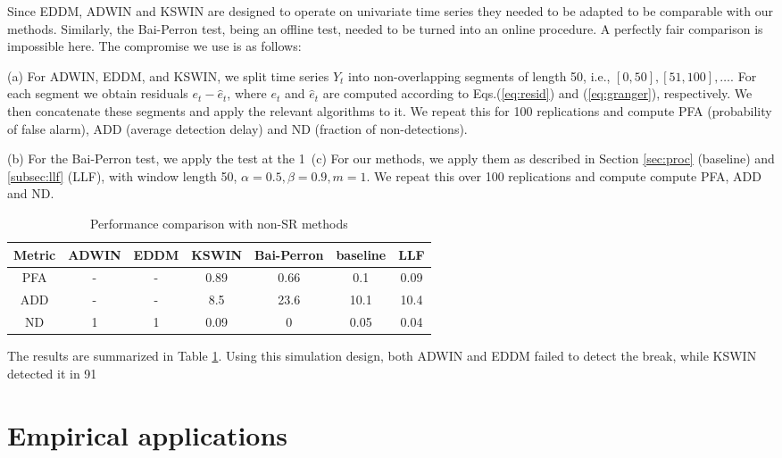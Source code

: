 Since EDDM, ADWIN and KSWIN are designed to operate on univariate time series they needed to be adapted to be comparable with our methods. Similarly, the Bai-Perron test, being an offline test, needed to be turned into an online procedure. A perfectly fair comparison is impossible here. The compromise we use is as follows:

(a) For ADWIN, EDDM, and KSWIN, we split time series $Y_t$ into non-overlapping segments of length 50, i.e., $[0,50], [51,100], \ldots.$ For each segment we obtain residuals $e_t - \hat{e}_t$, where $e_t$ and $\hat{e}_t$ are computed according to Eqs.(\ref{eq:resid}) and (\ref{eq:granger}), respectively. We then concatenate these segments and apply the relevant algorithms to it. We repeat this for 100 replications and compute PFA (probability of false alarm), ADD (average detection delay) and ND (fraction of non-detections).

(b) For the Bai-Perron test, we apply the test at the 1\
(c) For our methods, we apply them as described in Section \ref{sec:proc} (baseline) and  \ref{subsec:llf} (LLF), with window length 50, $\alpha = 0.5, \beta=0.9, m = 1$. We repeat this over 100 replications and compute compute PFA, ADD and ND.








\begin{table}[H]
    \centering
     \begin{tabular}{c | c c c c c c} 
         Metric & ADWIN & EDDM & KSWIN & Bai-Perron & baseline & LLF\\ [0.2ex] 
     \hline
     
     PFA &  - & - & 0.89 & 0.66 & 0.1 & 0.09 \\ 
     ADD & - & - & 8.5 & 23.6 & 10.1 & 10.4 \\
     ND &  1 & 1 & 0.09 & 0 & 0.05 & 0.04  \\
     \hline
     \end{tabular}
     \caption{Performance comparison with non-SR methods}
     \label{tab:comparison}
\end{table}

The results are summarized in Table \ref{tab:comparison}. Using this simulation design, both ADWIN and EDDM failed to detect the break, while KSWIN detected it in 91\


\section{Empirical applications}\label{sec:appl}

